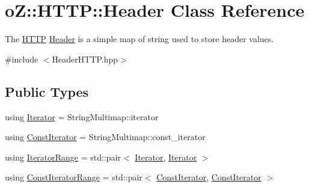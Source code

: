 \hypertarget{classo_z_1_1_h_t_t_p_1_1_header}{}\section{oZ\+::H\+T\+TP\+::Header Class Reference}
\label{classo_z_1_1_h_t_t_p_1_1_header}


The \mbox{\hyperlink{namespaceo_z_1_1_h_t_t_p}{H\+T\+TP}} \mbox{\hyperlink{classo_z_1_1_h_t_t_p_1_1_header}{Header}} is a simple map of string used to store header values.  




{\ttfamily \#include $<$Header\+H\+T\+T\+P.\+hpp$>$}

\subsection*{Public Types}
\begin{DoxyCompactItemize}
\item 
using \mbox{\hyperlink{classo_z_1_1_h_t_t_p_1_1_header_a572d529cae124a02fb68df9c3e51c576}{Iterator}} = String\+Multimap\+::iterator
\item 
using \mbox{\hyperlink{classo_z_1_1_h_t_t_p_1_1_header_a509c1ea8f5b221246e6e49c01a115d69}{Const\+Iterator}} = String\+Multimap\+::const\+\_\+iterator
\item 
using \mbox{\hyperlink{classo_z_1_1_h_t_t_p_1_1_header_a226f04d25adf24d2a683f82ef8327812}{Iterator\+Range}} = std\+::pair$<$ \mbox{\hyperlink{classo_z_1_1_h_t_t_p_1_1_header_a572d529cae124a02fb68df9c3e51c576}{Iterator}}, \mbox{\hyperlink{classo_z_1_1_h_t_t_p_1_1_header_a572d529cae124a02fb68df9c3e51c576}{Iterator}} $>$
\item 
using \mbox{\hyperlink{classo_z_1_1_h_t_t_p_1_1_header_a0823c7353e93de315929c96457563c3d}{Const\+Iterator\+Range}} = std\+::pair$<$ \mbox{\hyperlink{classo_z_1_1_h_t_t_p_1_1_header_a509c1ea8f5b221246e6e49c01a115d69}{Const\+Iterator}}, \mbox{\hyperlink{classo_z_1_1_h_t_t_p_1_1_header_a509c1ea8f5b221246e6e49c01a115d69}{Const\+Iterator}} $>$
\end{DoxyCompactItemize}
